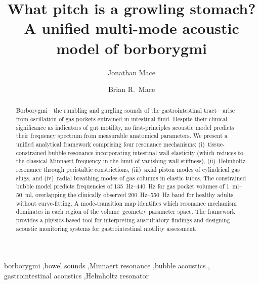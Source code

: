 \documentclass[review]{elsarticle}
\begin{document}
\begin{frontmatter}

\title{What pitch is a growling stomach? A unified multi-mode acoustic model of borborygmi}

\author[msr]{Jonathan Mace}

\author[auckland]{Brian R.\ Mace}


\begin{abstract}
Borborygmi---the rumbling and gurgling sounds of the gastrointestinal
tract---arise from oscillation of gas pockets entrained in intestinal fluid.
Despite their clinical significance as indicators of gut motility, no
first-principles acoustic model predicts their frequency spectrum from
measurable anatomical parameters.  We present a unified analytical framework
comprising four resonance mechanisms: (i)~tissue-constrained bubble
resonance incorporating intestinal wall elasticity (which reduces to the
classical Minnaert frequency in the limit of vanishing wall stiffness),
(ii)~Helmholtz resonance through peristaltic constrictions,
(iii)~axial piston modes of cylindrical gas slugs, and (iv)~radial breathing
modes of gas columns in elastic tubes.  The constrained bubble model predicts
frequencies of \SIrange{135}{440}{\hertz} for gas pocket volumes of
\SIrange{1}{50}{\milli\litre}, overlapping the clinically observed
\SIrange{200}{550}{\hertz} band for healthy adults without curve-fitting.
A mode-transition map identifies which resonance mechanism dominates in each
region of the volume--geometry parameter space.  The framework provides a
physics-based tool for interpreting auscultatory findings and designing acoustic
monitoring systems for gastrointestinal motility assessment.
\end{abstract}

\begin{keyword}
borborygmi \sep bowel sounds \sep Minnaert resonance \sep bubble acoustics \sep
gastrointestinal acoustics \sep Helmholtz resonator
\end{keyword}

\end{frontmatter}
\end{document}
